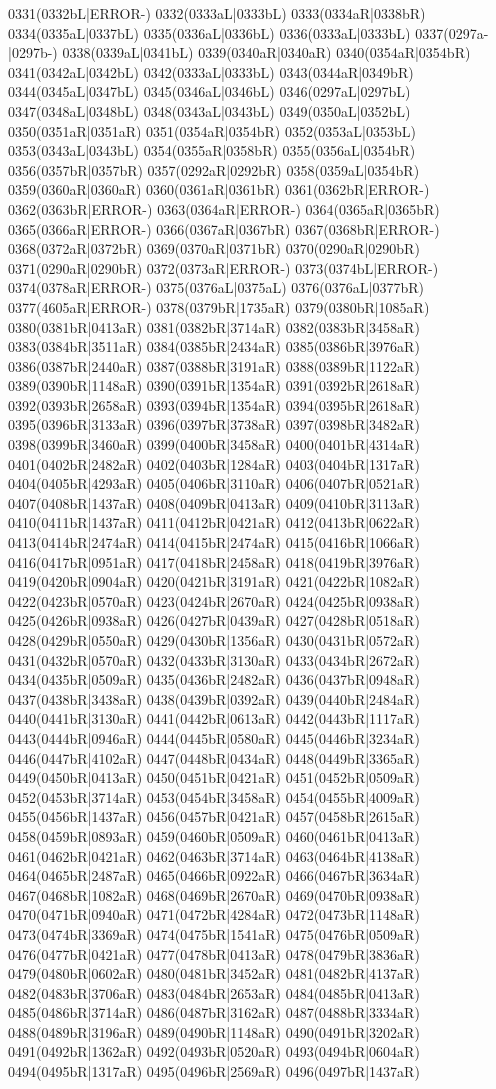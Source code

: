 0331(0332bL|ERROR-) 0332(0333aL|0333bL) 0333(0334aR|0338bR) 0334(0335aL|0337bL) 0335(0336aL|0336bL) 0336(0333aL|0333bL) 0337(0297a-|0297b-) 0338(0339aL|0341bL) 0339(0340aR|0340aR) 0340(0354aR|0354bR) 0341(0342aL|0342bL) 0342(0333aL|0333bL) 0343(0344aR|0349bR) 0344(0345aL|0347bL) 0345(0346aL|0346bL) 0346(0297aL|0297bL) 0347(0348aL|0348bL) 0348(0343aL|0343bL) 0349(0350aL|0352bL) 0350(0351aR|0351aR) 0351(0354aR|0354bR) 0352(0353aL|0353bL) 0353(0343aL|0343bL) 0354(0355aR|0358bR) 0355(0356aL|0354bR) 0356(0357bR|0357bR) 0357(0292aR|0292bR) 0358(0359aL|0354bR) 0359(0360aR|0360aR) 0360(0361aR|0361bR) 0361(0362bR|ERROR-) 0362(0363bR|ERROR-) 0363(0364aR|ERROR-) 0364(0365aR|0365bR) 0365(0366aR|ERROR-) 0366(0367aR|0367bR) 0367(0368bR|ERROR-) 0368(0372aR|0372bR) 0369(0370aR|0371bR) 0370(0290aR|0290bR) 0371(0290aR|0290bR) 0372(0373aR|ERROR-) 0373(0374bL|ERROR-) 0374(0378aR|ERROR-) 0375(0376aL|0375aL) 0376(0376aL|0377bR) 0377(4605aR|ERROR-) 0378(0379bR|1735aR) 0379(0380bR|1085aR) 0380(0381bR|0413aR) 0381(0382bR|3714aR) 0382(0383bR|3458aR) 0383(0384bR|3511aR) 0384(0385bR|2434aR) 0385(0386bR|3976aR) 0386(0387bR|2440aR) 0387(0388bR|3191aR) 0388(0389bR|1122aR) 0389(0390bR|1148aR) 0390(0391bR|1354aR) 0391(0392bR|2618aR) 0392(0393bR|2658aR) 0393(0394bR|1354aR) 0394(0395bR|2618aR) 0395(0396bR|3133aR) 0396(0397bR|3738aR) 0397(0398bR|3482aR) 0398(0399bR|3460aR) 0399(0400bR|3458aR) 0400(0401bR|4314aR) 0401(0402bR|2482aR) 0402(0403bR|1284aR) 0403(0404bR|1317aR) 0404(0405bR|4293aR) 0405(0406bR|3110aR) 0406(0407bR|0521aR) 0407(0408bR|1437aR) 0408(0409bR|0413aR) 0409(0410bR|3113aR) 0410(0411bR|1437aR) 0411(0412bR|0421aR) 0412(0413bR|0622aR) 0413(0414bR|2474aR) 0414(0415bR|2474aR) 0415(0416bR|1066aR) 0416(0417bR|0951aR) 0417(0418bR|2458aR) 0418(0419bR|3976aR) 0419(0420bR|0904aR) 0420(0421bR|3191aR) 0421(0422bR|1082aR) 0422(0423bR|0570aR) 0423(0424bR|2670aR) 0424(0425bR|0938aR) 0425(0426bR|0938aR) 0426(0427bR|0439aR) 0427(0428bR|0518aR) 0428(0429bR|0550aR) 0429(0430bR|1356aR) 0430(0431bR|0572aR) 0431(0432bR|0570aR) 0432(0433bR|3130aR) 0433(0434bR|2672aR) 0434(0435bR|0509aR) 0435(0436bR|2482aR) 0436(0437bR|0948aR) 0437(0438bR|3438aR) 0438(0439bR|0392aR) 0439(0440bR|2484aR) 0440(0441bR|3130aR) 0441(0442bR|0613aR) 0442(0443bR|1117aR) 0443(0444bR|0946aR) 0444(0445bR|0580aR) 0445(0446bR|3234aR) 0446(0447bR|4102aR) 0447(0448bR|0434aR) 0448(0449bR|3365aR) 0449(0450bR|0413aR) 0450(0451bR|0421aR) 0451(0452bR|0509aR) 0452(0453bR|3714aR) 0453(0454bR|3458aR) 0454(0455bR|4009aR) 0455(0456bR|1437aR) 0456(0457bR|0421aR) 0457(0458bR|2615aR) 0458(0459bR|0893aR) 0459(0460bR|0509aR) 0460(0461bR|0413aR) 0461(0462bR|0421aR) 0462(0463bR|3714aR) 0463(0464bR|4138aR) 0464(0465bR|2487aR) 0465(0466bR|0922aR) 0466(0467bR|3634aR) 0467(0468bR|1082aR) 0468(0469bR|2670aR) 0469(0470bR|0938aR) 0470(0471bR|0940aR) 0471(0472bR|4284aR) 0472(0473bR|1148aR) 0473(0474bR|3369aR) 0474(0475bR|1541aR) 0475(0476bR|0509aR) 0476(0477bR|0421aR) 0477(0478bR|0413aR) 0478(0479bR|3836aR) 0479(0480bR|0602aR) 0480(0481bR|3452aR) 0481(0482bR|4137aR) 0482(0483bR|3706aR) 0483(0484bR|2653aR) 0484(0485bR|0413aR) 0485(0486bR|3714aR) 0486(0487bR|3162aR) 0487(0488bR|3334aR) 0488(0489bR|3196aR) 0489(0490bR|1148aR) 0490(0491bR|3202aR) 0491(0492bR|1362aR) 0492(0493bR|0520aR) 0493(0494bR|0604aR) 0494(0495bR|1317aR) 0495(0496bR|2569aR) 0496(0497bR|1437aR) 